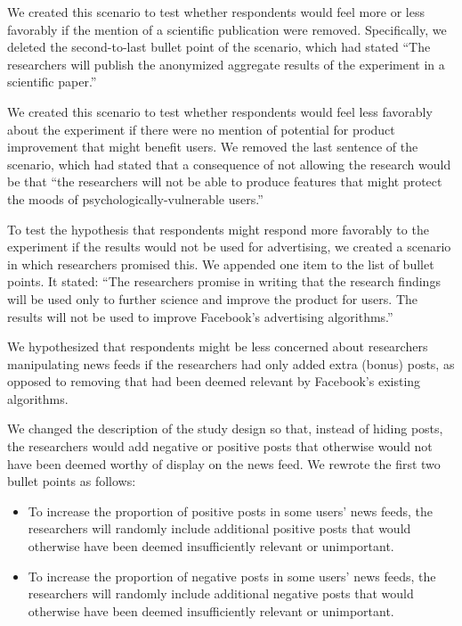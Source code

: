 We created this scenario to test whether respondents would feel more or less favorably if the mention of a scientific publication were removed.  Specifically, we deleted the second-to-last bullet point of the scenario, which had stated ``The researchers will publish the anonymized aggregate results of the experiment in a scientific paper.''

We created this scenario to test whether respondents would feel less favorably about the experiment if there were no mention of potential for product improvement that might benefit users.
We removed the last sentence of the scenario, which had stated that a consequence of not allowing the research would be that ``the researchers will not be able to produce features that might protect the moods of psychologically-vulnerable users.''

To test the hypothesis that respondents might respond more favorably to the experiment if the results would not be used for advertising, we created a scenario in which researchers promised this.  We appended one item to the list of bullet points.  It stated: ``The researchers promise in writing that the research findings will be used only to further science and improve the product for users.  The results will not be used to improve Facebook's advertising algorithms.''

We hypothesized that respondents might be less concerned about researchers manipulating news feeds if the researchers had only added extra (bonus) posts, as opposed to removing that had been deemed relevant by Facebook's existing algorithms.

We changed the description of the study design so that, instead of hiding posts, the researchers would add negative or positive posts that otherwise would not have been deemed worthy of display on the news feed.
We rewrote the first two bullet points as follows:
\begin{itemize}
\item
To increase the proportion of positive posts in some users' news feeds, the researchers will randomly include additional positive posts that would otherwise have been deemed insufficiently relevant or unimportant.
\item
To increase the proportion of negative posts in some users' news feeds, the researchers will randomly include additional negative posts that would otherwise have been deemed insufficiently relevant or unimportant.
\end{itemize}

